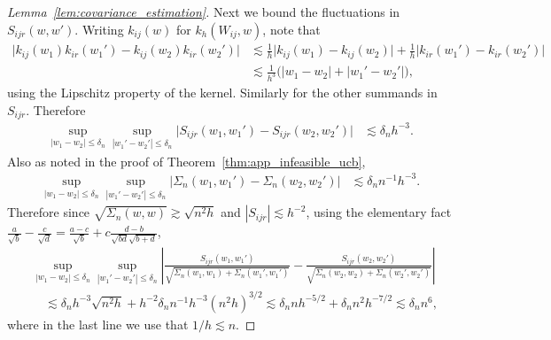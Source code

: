 \begin{proof}[Lemma~\ref{lem:covariance_estimation}]
  Next we bound the fluctuations in $S_{ijr}(w,w')$.
  Writing $k_{ij}(w)$ for $k_h(W_{ij},w)$,
  note that
  \begin{align*}
    \big|
    k_{ij}(w_1)
    k_{ir}(w_1')
    - k_{ij}(w_2)
    k_{ir}(w_2')
    \big|
    &\lesssim
    \frac{1}{h}
    \big| k_{ij}(w_1) - k_{ij}(w_2) \big|
    +
    \frac{1}{h}
    \big| k_{ir}(w_1') - k_{ir}(w_2') \big| \\
    &\lesssim
    \frac{1}{h^3}
    \Big(
    |w_1 - w_2|
    + |w_1' - w_2'|
    \Big),
  \end{align*}
  using the Lipschitz property of the kernel.
  Similarly for the other summands in $S_{ijr}$.
  Therefore
  \begin{align*}
    \sup_{|w_1-w_2| \leq \delta_n}
    \sup_{|w_1'-w_2'| \leq \delta_n}
    \big|
    S_{ijr}(w_1, w_1')
    - S_{ijr}(w_2, w_2')
    \big|
    &\lesssim
    \delta_n h^{-3}.
  \end{align*}
  Also as noted in the proof of Theorem~\ref{thm:app_infeasible_ucb},
  \begin{align*}
    \sup_{|w_1-w_2| \leq \delta_n}
    \sup_{|w_1'-w_2'| \leq \delta_n}
    \big|
    \Sigma_n(w_1,w_1')
    -
    \Sigma_n(w_2, w_2')
    \big|
    &\lesssim
    \delta_n n^{-1}h^{-3}.
  \end{align*}
  Therefore since $\sqrt{\Sigma_n(w,w)} \gtrsim \sqrt{n^2h}$
  and $|S_{ijr}| \lesssim h^{-2}$,
  using the elementary fact
  $\frac{a}{\sqrt b} - \frac{c}{\sqrt d}
  = \frac{a-c}{\sqrt b} + c \frac{d-b}{\sqrt{b d} \sqrt{b+d}}$,
  \begin{align*}
    &\sup_{|w_1-w_2| \leq \delta_n}
    \sup_{|w_1'-w_2'| \leq \delta_n}
    \left|
    \frac{S_{ijr}(w_1, w_1')}
    {\sqrt{\Sigma_n(w_1,w_1) + \Sigma_n(w_1',w_1')}}
    - \frac{S_{ijr}(w_2, w_2')}
    {\sqrt{\Sigma_n(w_2,w_2) + \Sigma_n(w_2',w_2')}}
    \right| \\
    &\quad\lesssim
    \delta_n h^{-3} \sqrt{n^2h}
    + h^{-2} \delta_n n^{-1} h^{-3} (n^2h)^{3/2}
    \lesssim
    \delta_n n h^{-5/2}
    + \delta_n n^{2} h^{-7/2}
    \lesssim
    \delta_n n^{6},
  \end{align*}
  where in the last line we use that
  $1/h \lesssim n$.



\end{proof}
